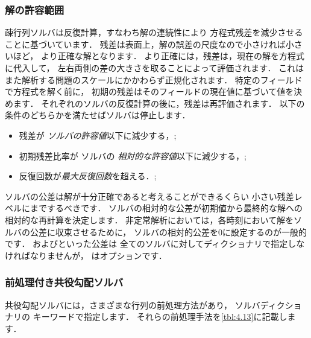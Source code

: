 \subsubsection{解の許容範囲}
\label{sssec:4.5.1.1}
疎行列ソルバは反復計算，すなわち解の連続性により
方程式残差を減少させることに基づいています．
残差は表面上，解の誤差の尺度なので小さければ小さいほど，
より正確な解となります．
より正確には，残差は，現在の解を方程式に代入して，
左右両側の差の大きさを取ることによって評価されます．
これはまた解析する問題のスケールにかかわらず正規化されます．
特定のフィールドで方程式を解く前に，
初期の残差はそのフィールドの現在値に基づいて値を決めます．
それぞれのソルバの反復計算の後に，残差は再評価されます．
以下の条件のどちらかを満たせばソルバは停止します．
\begin{itemize}
 \item 残差が
%
%
       \emph{ソルバの許容値}以下に減少する，;
 \item 初期残差比率が
%
%
       ソルバの
%
       \emph{相対的な許容値}以下に減少する，;
 \item 反復回数が\emph{最大反復回数}を超える．;
%
%
\end{itemize}
ソルバの公差は解が十分正確であると考えることができるくらい
小さい残差レベルにまでするべきです．
ソルバの相対的な公差が初期値から最終的な解への相対的な再計算を決定します．
非定常解析においては，各時刻において解をソルバの公差に収束させるために，
ソルバの相対的公差を$0$に設定するのが一般的です．
およびといった公差は
全てのソルバに対してディクショナリで指定しなければなりませんが，
はオプションです．


\subsubsection{前処理付き共役勾配ソルバ}
\label{sssec:4.5.1.2}
共役勾配ソルバには，さまざまな行列の前処理方法があり，
ソルバディクショナリの
%
%
キーワードで指定します．
それらの前処理手法を\autoref{tbl:4.13}に記載します．



